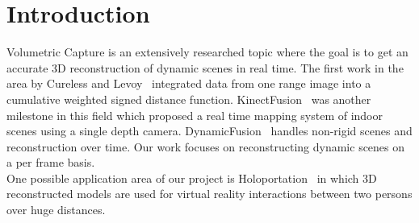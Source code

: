\documentclass[10pt,twocolumn,letterpaper]{article}
\begin{document}
\section{Introduction}

Volumetric Capture is an extensively researched topic where the goal is to get an accurate 3D reconstruction of dynamic scenes in real time. The first work in the area by Cureless and Levoy~\cite{Authors4} integrated data from one range image into a cumulative weighted signed distance function. KinectFusion~\cite{Authors5} was another milestone in this field which proposed a real time mapping system of indoor scenes using a single depth camera. DynamicFusion~\cite{Authors6} handles non-rigid scenes and reconstruction over time. Our work focuses on reconstructing dynamic scenes on a per frame basis.\\ 
One possible application area of our project is Holoportation~\cite{Authors7} in which 3D reconstructed models are used for virtual reality interactions between two persons over huge distances.
\end{document}
